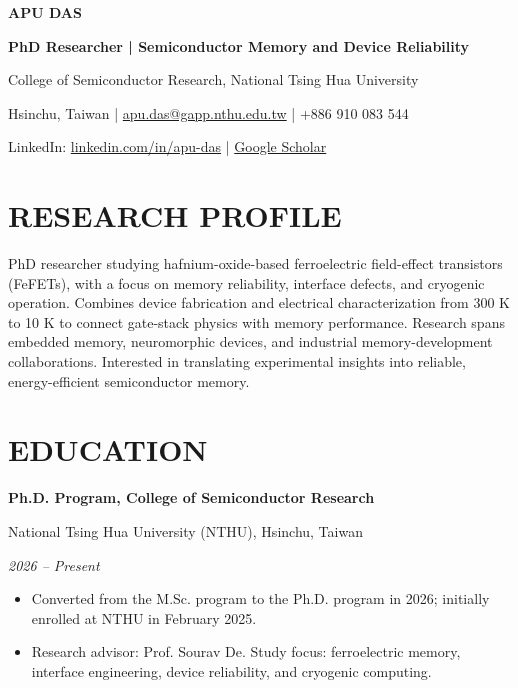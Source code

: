 \documentclass[10pt,a4paper]{article}
\newcommand{\entry}[3]{%
  \par\addvspace{4pt}%
  \needspace{4\baselineskip}%
  \textbf{#1}\par
  #2\par
  \textit{#3}\par
}
\begin{document}
{\fontsize{24}{27}\selectfont\bfseries APU DAS}\par
\textbf{PhD Researcher | Semiconductor Memory and Device Reliability}\par
College of Semiconductor Research, National Tsing Hua University\par
Hsinchu, Taiwan |
\href{mailto:apu.das@gapp.nthu.edu.tw}{apu.das@gapp.nthu.edu.tw}
| +886 910 083 544\par
LinkedIn:
\href{https://linkedin.com/in/apu-das}{linkedin.com/in/apu-das}
\enspace | \enspace
\href{https://scholar.google.com/citations?user=GQbj1p4AAAAJ&hl=en}
{Google Scholar}

\section{RESEARCH PROFILE}

PhD researcher studying hafnium-oxide-based ferroelectric
field-effect transistors (FeFETs), with a focus on memory
reliability, interface defects, and cryogenic operation.
Combines device fabrication and electrical characterization
from 300 K to 10 K to connect gate-stack physics with memory
performance. Research spans embedded memory, neuromorphic
devices, and industrial memory-development collaborations.
Interested in translating experimental insights into reliable,
energy-efficient semiconductor memory.

\section{EDUCATION}

\entry
  {Ph.D. Program, College of Semiconductor Research}
  {National Tsing Hua University (NTHU), Hsinchu, Taiwan}
  {2026 -- Present}

\begin{itemize}
  \item Converted from the M.Sc. program to the Ph.D. program
        in 2026; initially enrolled at NTHU in February 2025.
  \item Research advisor: Prof. Sourav De.
        Study focus: ferroelectric memory, interface engineering,
        device reliability, and cryogenic computing.
\end{itemize}
\end{document}
